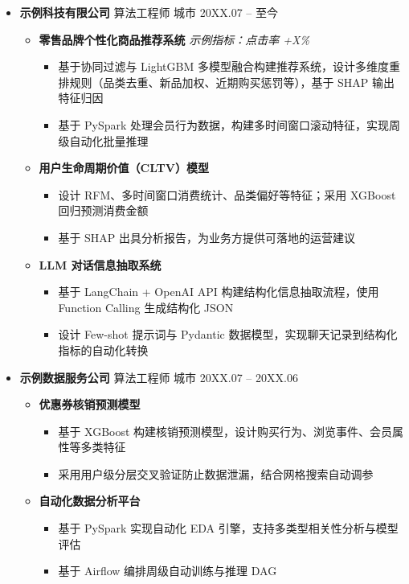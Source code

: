 \documentclass[zh]{resume}
\begin{document}
\begin{itemize}

  \item \textbf{示例科技有限公司} \quad 算法工程师 \quad 城市 \hfill 20XX.07 -- 至今

  \begin{itemize}
    \item \textbf{零售品牌个性化商品推荐系统} \quad \textit{示例指标：点击率 +X\%}
    \begin{itemize}
      \item 基于协同过滤与 LightGBM 多模型融合构建推荐系统，设计多维度重排规则（品类去重、新品加权、近期购买惩罚等），基于 SHAP 输出特征归因
      \item 基于 PySpark 处理会员行为数据，构建多时间窗口滚动特征，实现周级自动化批量推理
    \end{itemize}

    \item \textbf{用户生命周期价值（CLTV）模型}
    \begin{itemize}
      \item 设计 RFM、多时间窗口消费统计、品类偏好等特征；采用 XGBoost 回归预测消费金额
      \item 基于 SHAP 出具分析报告，为业务方提供可落地的运营建议
    \end{itemize}

    \item \textbf{LLM 对话信息抽取系统}
    \begin{itemize}
      \item 基于 LangChain + OpenAI API 构建结构化信息抽取流程，使用 Function Calling 生成结构化 JSON
      \item 设计 Few-shot 提示词与 Pydantic 数据模型，实现聊天记录到结构化指标的自动化转换
    \end{itemize}
  \end{itemize}

  \item \textbf{示例数据服务公司} \quad 算法工程师 \quad 城市 \hfill 20XX.07 -- 20XX.06

  \begin{itemize}
    \item \textbf{优惠券核销预测模型}
    \begin{itemize}
      \item 基于 XGBoost 构建核销预测模型，设计购买行为、浏览事件、会员属性等多类特征
      \item 采用用户级分层交叉验证防止数据泄漏，结合网格搜索自动调参
    \end{itemize}

    \item \textbf{自动化数据分析平台}
    \begin{itemize}
      \item 基于 PySpark 实现自动化 EDA 引擎，支持多类型相关性分析与模型评估
      \item 基于 Airflow 编排周级自动训练与推理 DAG
    \end{itemize}
  \end{itemize}

\end{itemize}
\end{document}
